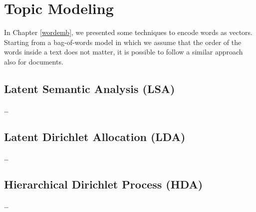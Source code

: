 \chapter{Topic Modeling}

In Chapter \ref{wordemb}, we presented some techniques to encode words as vectors.
Starting from a bag-of-words model in which we assume that the order of the words
inside a text does not matter, it is possible to follow a similar approach also for documents.

\section{Latent Semantic Analysis (LSA)}
\dots

\section{Latent Dirichlet Allocation (LDA)}
\dots

\section{Hierarchical Dirichlet Process (HDA)}
\dots